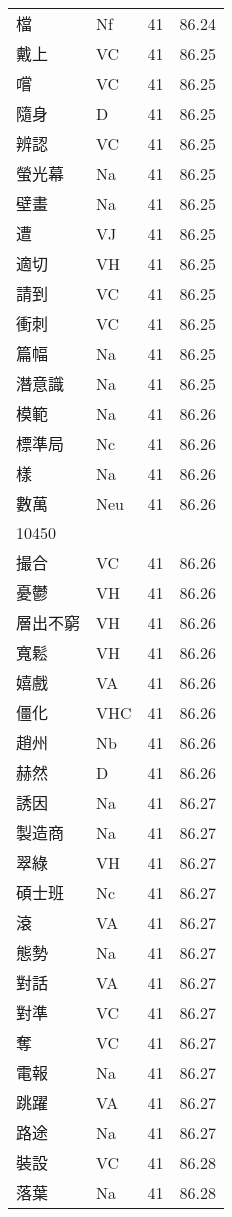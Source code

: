 \documentclass[twocolumn]{book}
\begin{document}
\begin{supertabular}{llrr}
檔 & Nf & 41 &  86.24\\
戴上 & VC & 41 &  86.25\\
嚐 & VC & 41 &  86.25\\
隨身 & D & 41 &  86.25\\
辨認 & VC & 41 &  86.25\\
螢光幕 & Na & 41 &  86.25\\
壁畫 & Na & 41 &  86.25\\
遭 & VJ & 41 &  86.25\\
適切 & VH & 41 &  86.25\\
請到 & VC & 41 &  86.25\\
衝刺 & VC & 41 &  86.25\\
篇幅 & Na & 41 &  86.25\\
潛意識 & Na & 41 &  86.25\\
模範 & Na & 41 &  86.26\\
標準局 & Nc & 41 &  86.26\\
樣 & Na & 41 &  86.26\\
數萬 & Neu & 41 &  86.26\\
10450\\
撮合 & VC & 41 &  86.26\\
憂鬱 & VH & 41 &  86.26\\
層出不窮 & VH & 41 &  86.26\\
寬鬆 & VH & 41 &  86.26\\
嬉戲 & VA & 41 &  86.26\\
僵化 & VHC & 41 &  86.26\\
趙州 & Nb & 41 &  86.26\\
赫然 & D & 41 &  86.26\\
誘因 & Na & 41 &  86.27\\
製造商 & Na & 41 &  86.27\\
翠綠 & VH & 41 &  86.27\\
碩士班 & Nc & 41 &  86.27\\
滾 & VA & 41 &  86.27\\
態勢 & Na & 41 &  86.27\\
對話 & VA & 41 &  86.27\\
對準 & VC & 41 &  86.27\\
奪 & VC & 41 &  86.27\\
電報 & Na & 41 &  86.27\\
跳躍 & VA & 41 &  86.27\\
路途 & Na & 41 &  86.27\\
裝設 & VC & 41 &  86.28\\
落葉 & Na & 41 &  86.28\\

\end{supertabular}
\end{document}
